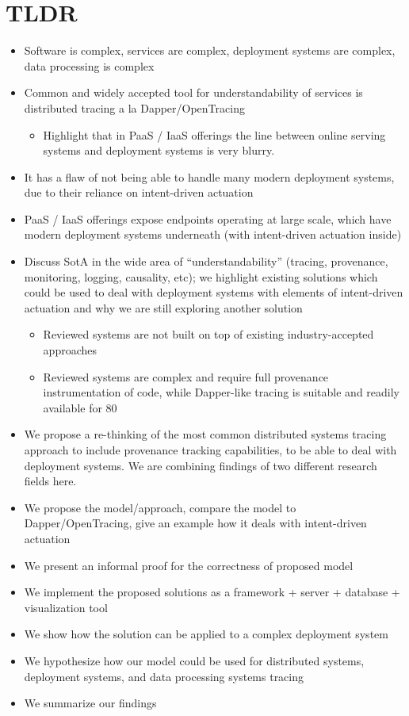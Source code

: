 \newpage %
\section{TLDR}
\setlength{\parskip}{9.96pt}

\begin{itemize}
    \item Software is complex, services are complex, deployment systems are complex, data processing is complex
    \item Common and widely accepted tool for understandability of services is distributed tracing a la Dapper/OpenTracing
    \begin{itemize}[label=---]
        \item Highlight that in PaaS / IaaS offerings the line between online serving systems and deployment systems is very blurry.
    \end{itemize}
    \item It has a flaw of not being able to handle many modern deployment systems, due to their reliance on intent-driven actuation
    \item PaaS / IaaS offerings expose endpoints operating at large scale, which have modern deployment systems underneath (with intent-driven actuation inside)
    \item Discuss SotA in the wide area of “understandability” (tracing, provenance, monitoring, logging, causality, etc); we highlight existing solutions which could be used to deal with deployment systems with elements of intent-driven actuation and why we are still exploring another solution
    \begin{itemize}[label=---]
        \item Reviewed systems are not built on top of existing industry-accepted approaches
        \item Reviewed systems are complex and require full provenance instrumentation of code, while Dapper-like tracing is suitable and readily available for 80%
    \end{itemize}
    \item We propose a re-thinking of the most common distributed systems tracing approach to include provenance tracking capabilities, to be able to deal with deployment systems. We are combining findings of two different research fields here.
    \item We propose the model/approach, compare the model to Dapper/OpenTracing, give an example how it deals with intent-driven actuation
    \item We present an informal proof for the correctness of proposed model
    \item We implement the proposed solutions as a framework + server + database + visualization tool
    \item We show how the solution can be applied to a complex deployment system
    \item We hypothesize how our model could be used for distributed systems, deployment systems, and data processing systems tracing
    \item We summarize our findings
\end{itemize}

